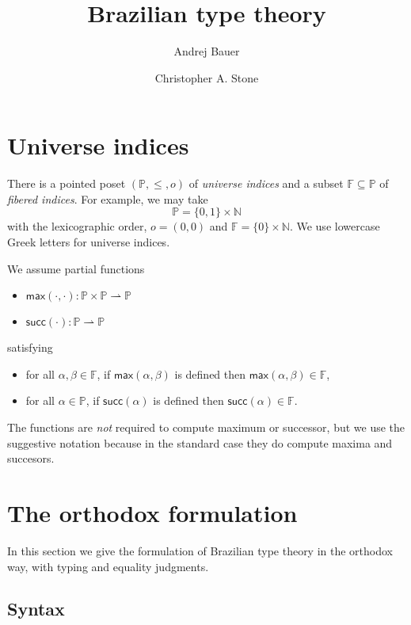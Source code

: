 \documentclass{article}
\newcommand{\NN}{\mathbb{N}} %
\newcommand{\PP}{\mathbb{P}} %
\newcommand{\FF}{\mathbb{F}} %
\newcommand{\zero}{o} %
\newcommand{\piClose}[2]{\mathsf{max}(#1,#2)}   %
\newcommand{\uClose}[1]{\mathsf{succ}(#1)}  %
\begin{document}
\title{Brazilian type theory}
\author{Andrej Bauer \and Christopher A. Stone}
\maketitle

\section{Universe indices}
\label{sec:universe-indices}

There is a pointed poset $(\PP, {\leq}, \zero)$ of \emph{universe
  indices} and a subset $\FF \subseteq \PP$ of \emph{fibered indices}.
For example, we may take
%
\begin{equation*}
  \PP = \{0,1\} \times \NN
\end{equation*}
%
with the lexicographic order, $\zero = (0,0)$ and $\FF = \{0\} \times
\NN$. We use lowercase Greek letters for universe indices.

We assume partial functions 
\begin{itemize}
  \item $\piClose{\cdot}{\cdot} : \PP \times \PP \rightharpoonup \PP$
  \item $\uClose{\cdot}  : \PP \rightharpoonup \PP$
\end{itemize}
%
satisfying
%
\begin{itemize}
\item for all $\alpha, \beta \in \FF$, if $\piClose{\alpha}{\beta}$ is defined then
  $\piClose{\alpha}{\beta} \in \FF$,
\item for all $\alpha \in \PP$, if $\uClose{\alpha}$ is defined then $\uClose{\alpha} \in
  \FF$.
\end{itemize}
%
The functions are \emph{not} required to compute maximum or successor, but we use the
suggestive notation because in the standard case they do compute maxima and succesors.

\section{The orthodox formulation}
\label{sec:orthodox-formulation}

In this section we give the formulation of Brazilian type theory in the orthodox way, with
typing and equality judgments.

\subsection{Syntax}
\label{sec:syntax}
\end{document}
